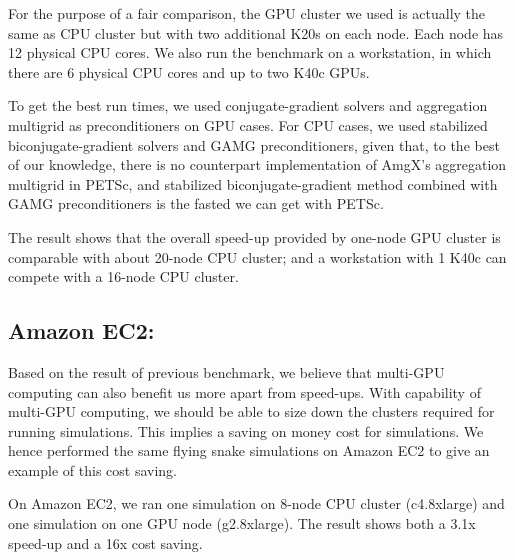     For the purpose of a fair comparison,
    the GPU cluster we used is actually the same as CPU cluster but with two additional K20s on each node.
    Each node has 12 physical CPU cores.
    We also run the benchmark on a workstation, 
    in which there are 6 physical CPU cores and up to two K40c GPUs.

    To get the best run times, 
    we used conjugate-gradient solvers and aggregation multigrid as preconditioners on GPU cases.
    For CPU cases,
    we used stabilized biconjugate-gradient solvers and GAMG preconditioners,
    given that, to the best of our knowledge, 
    there is no counterpart implementation of AmgX's aggregation multigrid in PETSc,
    and stabilized biconjugate-gradient method 
    combined with GAMG preconditioners is the fasted we can get with PETSc.

    The result shows that the overall speed-up provided by one-node GPU cluster
    is comparable with about 20-node CPU cluster; 
    and a workstation with 1 K40c can compete with a 16-node CPU cluster.

\subsection{Amazon EC2:}

    Based on the result of previous benchmark,
    we believe that multi-GPU computing can also benefit us more apart from speed-ups.
    With capability of multi-GPU computing,
    we should be able to size down the clusters required for running simulations.
    This implies a saving on money cost for simulations.
    We hence performed the same flying snake simulations on Amazon EC2
    to give an example of this cost saving.

    On Amazon EC2, we ran one simulation on 8-node CPU cluster (c4.8xlarge)
    and one simulation on one GPU node (g2.8xlarge). 
    The result shows both a 3.1x speed-up and a 16x cost saving.


